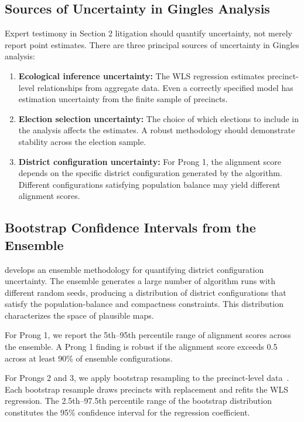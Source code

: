 \label{sec:confidence-intervals}

\subsection{Sources of Uncertainty in Gingles Analysis}

Expert testimony in Section 2 litigation should quantify uncertainty, not
merely report point estimates.  There are three principal sources of
uncertainty in Gingles analysis:

\begin{enumerate}
  \item \textbf{Ecological inference uncertainty:} The WLS regression
    estimates precinct-level relationships from aggregate data.  Even a
    correctly specified model has estimation uncertainty from the finite
    sample of precincts.

  \item \textbf{Election selection uncertainty:} The choice of which elections
    to include in the analysis affects the estimates.  A robust methodology
    should demonstrate stability across the election sample.

  \item \textbf{District configuration uncertainty:} For Prong 1, the alignment
    score depends on the specific district configuration generated by the
    algorithm.  Different configurations satisfying population balance may
    yield different alignment scores.
\end{enumerate}

\subsection{Bootstrap Confidence Intervals from the Ensemble}

\citet{dellaLibera2026uncertainty} develops an ensemble methodology for
quantifying district configuration uncertainty.  The ensemble generates a
large number of algorithm runs with different random seeds, producing a
distribution of district configurations that satisfy the population-balance
and compactness constraints.  This distribution characterizes the space
of plausible maps.

For Prong 1, we report the 5th--95th percentile range of alignment scores
across the ensemble.  A Prong 1 finding is robust if the alignment score
exceeds 0.5 across at least 90\% of ensemble configurations.

For Prongs 2 and 3, we apply bootstrap resampling to the precinct-level
data~\citep{efron1979bootstrap}.  Each bootstrap resample draws precincts
with replacement and refits the WLS regression.  The 2.5th--97.5th percentile
range of the bootstrap distribution constitutes the 95\% confidence interval
for the regression coefficient.

